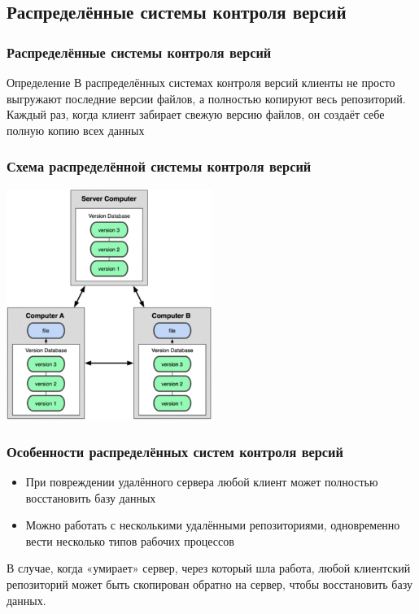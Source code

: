 \documentclass{../industrial-development}
\begin{document}
\subsection{Распределённые системы контроля версий}

\begin{frame} \frametitle{Распределённые системы контроля версий}
  \begin{block}{Определение}
    В \alert{распределённых системах контроля версий} клиенты не просто выгружают последние версии файлов, а полностью копируют весь репозиторий. Каждый раз, когда клиент забирает свежую версию файлов, он создаёт себе полную копию всех данных
  \end{block}
 
\end{frame}

\begin{frame} \frametitle{Схема распределённой системы контроля версий}
  \centerline{\includegraphics[width=0.5\textwidth]{distributedVCS.pdf}}
\end{frame}

\begin{frame} \frametitle{Особенности распределённых систем контроля версий}
  \begin{itemize}
  \item При повреждении удалённого сервера любой клиент может полностью восстановить базу данных
  \item Можно работать с несколькими удалёнными репозиториями, одновременно вести несколько типов рабочих процессов
  \end{itemize}
\end{frame}

\lecturenotes

В случае, когда «умирает» сервер, через который шла работа, любой клиентский репозиторий может быть скопирован обратно на сервер, чтобы восстановить базу данных. 
\end{document}
